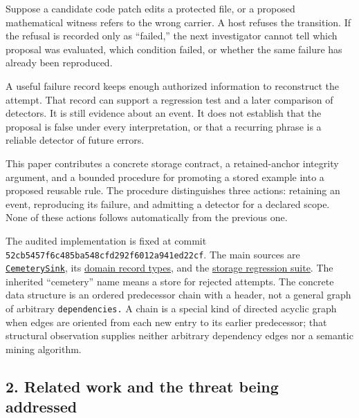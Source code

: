 \documentclass[
  11pt,
]{article}
\newcommand{\passthrough}[1]{#1}
\begin{document}
Suppose a candidate code patch edits a protected file, or a proposed
mathematical witness refers to the wrong carrier. A host refuses the
transition. If the refusal is recorded only as ``failed,'' the next
investigator cannot tell which proposal was evaluated, which condition
failed, or whether the same failure has already been reproduced.

A useful failure record keeps enough authorized information to
reconstruct the attempt. That record can support a regression test and a
later comparison of detectors. It is still evidence about an event. It
does not establish that the proposal is false under every
interpretation, or that a recurring phrase is a reliable detector of
future errors.

This paper contributes a concrete storage contract, a retained-anchor
integrity argument, and a bounded procedure for promoting a stored
example into a proposed reusable rule. The procedure distinguishes three
actions: retaining an event, reproducing its failure, and admitting a
detector for a declared scope. None of these actions follows
automatically from the previous one.

The audited implementation is fixed at commit
\nolinkurl{52cb5457f6c485ba548cfd292f6012a941ed22cf}. The main sources
are
\href{https://github.com/dbccpage/the_symbol_game/blob/52cb5457f6c485ba548cfd292f6012a941ed22cf/pfp/infrastructure/persistence/cemetery_sink.py}{\passthrough{\lstinline!CemeterySink!}},
its
\href{https://github.com/dbccpage/the_symbol_game/blob/52cb5457f6c485ba548cfd292f6012a941ed22cf/pfp/domain/entities/cemetery_entry.py}{domain
record types}, and the
\href{https://github.com/dbccpage/the_symbol_game/blob/52cb5457f6c485ba548cfd292f6012a941ed22cf/pfp/tests/test_cemetery_sink.py}{storage
regression suite}. The inherited ``cemetery'' name means a store for
rejected attempts. The concrete data structure is an ordered predecessor
chain with a header, not a general graph of arbitrary
\nolinkurl{dependencies.} A chain is a special kind of directed acyclic
graph when edges are oriented from each new entry to its earlier
predecessor; that structural observation supplies neither arbitrary
dependency edges nor a semantic mining algorithm.

\subsection{2. Related work and the threat being
addressed}\label{related-work-and-the-threat-being-addressed}
\end{document}
